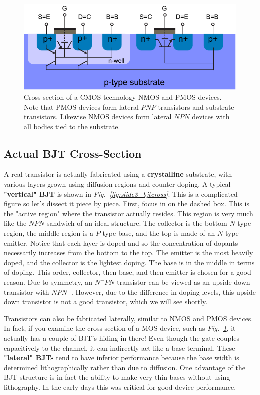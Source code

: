 \begin{figure}[H]
\centering
\includegraphics[width=.95\columnwidth]{mos_bjt}
\caption{Cross-section of a CMOS technology NMOS and PMOS devices.  Note that PMOS devices form lateral $PNP$ transistors and substrate transistors.  Likewise NMOS devices form lateral $NPN$ devices with all bodies tied to the substrate.}
\label{fig:mos_bjt}
\end{figure}
\subsection{Actual BJT Cross-Section}
A real transistor is actually fabricated using a \textbf{crystalline} substrate, with various layers grown using diffusion regions and counter-doping.  A typical \textbf{"vertical" BJT} is shown in \emph{Fig.~\ref{fig:slide3_bjtcross}}.  This is a complicated figure so let's dissect it piece by piece.  First, focus in on the dashed box.  This is the "active region" where the transistor actually resides.  This region is very much like the $NPN$ sandwich of an ideal structure.  The collector is the bottom $N$-type region, the middle region is a $P$-type base, and the top is made of an $N$-type emitter.  Notice that each layer is doped and so the concentration of dopants necessarily increases from the bottom to the top. The emitter is the most heavily doped, and the collector is the lightest doping. The base is in the middle in terms of doping.  This order, collector, then base, and then emitter is chosen for a good reason.  Due to symmetry, an $N^+PN$ transistor can be viewed as an upside down transistor with $NPN^+$.  However, due to the difference in doping levels, this upside down transistor is not a good transistor, which we will see shortly.

Transistors can also be fabricated laterally, similar to NMOS and PMOS devices.  In fact, if you examine the cross-section of a MOS device, such as \emph{Fig.~\ref{fig:mos_bjt}}, it actually has a couple of BJT's hiding in there!  Even though the gate couples capacitively to the channel, it can indirectly act like a base terminal.  These \textbf{"lateral" BJTs} tend to have inferior performance because the base width is determined lithographically rather than due to diffusion. One advantage of the BJT structure is in fact the ability to make very thin bases without using lithography.  In the early days this was critical for good device performance.

